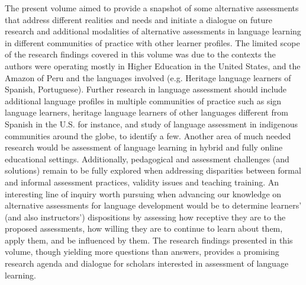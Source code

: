 \documentclass[output=paper]{langscibook}
\begin{document}
The present volume aimed to provide a snapshot of some alternative assessments that address different realities and needs and initiate a dialogue on future research and additional modalities of alternative assessments in language learning in different communities of practice with other learner profiles. The limited scope of the research findings covered in this volume was due to the contexts the authors were operating mostly in Higher Education in the United States, and the Amazon of Peru and the languages involved (e.g. Heritage language learners of Spanish, Portuguese). Further research in language assessment should include additional language profiles in multiple communities of practice such as sign language learners, heritage language learners of other languages different from Spanish in the U.S. for instance, and study of language assessment in indigenous communities around the globe, to identify a few. Another area of much needed research would be assessment of language learning in hybrid and fully online educational settings. Additionally, pedagogical and assessment challenges (and solutions) remain to be fully explored when addressing disparities between formal and informal assessment practices, validity issues and teaching training. An interesting line of inquiry worth pursuing when advancing our knowledge on alternative assessments for language development would be to determine learners' (and also instructors') dispositions by assessing how receptive they are to the proposed assessments, how willing they are to continue to learn about them, apply them, and be influenced by them. The research findings presented in this volume, though yielding more questions than answers, provides a promising research agenda and dialogue for scholars interested in assessment of language learning.


\sloppy
\printbibliography[heading=subbibliography,notkeyword=this]
\end{document}
